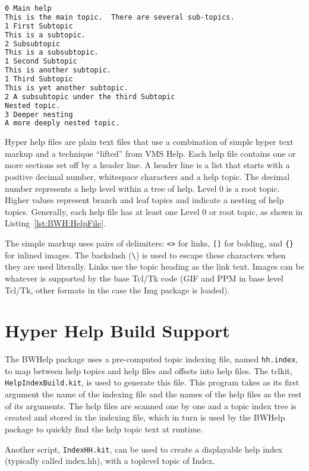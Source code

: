 \begin{lstlisting}[language=HTML,
		   caption={Typical help file},
		   label={lst:BWH:HelpFile}]
0 Main help
This is the main topic.  There are several sub-topics.
1 First Subtopic
This is a subtopic.
2 Subsubtopic
This is a subsubtopic.
1 Second Subtopic
This is another subtopic.
1 Third Subtopic
This is yet another subtopic.
2 A subsubtopic under the third Subtopic
Nested topic.
3 Deeper nesting
A more deeply nested topic.
\end{lstlisting}
Hyper help files are plain text files that use a combination of simple
hyper text markup and a technique ``lifted'' from VMS Help.  Each help
file contains one or more sections set off by a header line.  A header
line is a list that starts with a positive decimal number, whitespace
characters and a help topic.  The decimal number represents a help
level within a tree of help.  Level 0 is a root topic.  Higher values
represent branch and leaf topics and indicate a nesting of help topics.
Generally, each help file has at least one Level 0 or root topic, as
shown in Listing~\ref{lst:BWH:HelpFile}.

The simple markup uses pairs of delimiters: \verb=<>= for links,
\verb=[]= for bolding, and \verb={}= for inlined images.  The backslash
(\verb=\=) is used to escape these characters when they are used
literally.  Links use the topic heading as the link text.  Images can be
whatever is supported by the base Tcl/Tk code (GIF and PPM in base level
Tcl/Tk, other formats in the case the Img package is loaded).


\section{Hyper Help Build Support}
\label{sect:BWH:BuildIndex}

The BWHelp package uses a pre-computed topic indexing file, named
\verb=hh.index=, to map between help topics and help files and offsets
into help files.  The tclkit, \verb=HelpIndexBuild.kit=, is used to
generate this file.  This program takes as its first argument the name
of the indexing file and the names of the help files as the rest of its
arguments.  The help files are scanned one by one and a topic index tree is
created and stored in the indexing file, which in turn is used by the
BWHelp package to quickly find the help topic text at runtime.

Another script, \verb=IndexHH.kit=, can be used to create a displayable
help index (typically called index.hh), with a toplevel topic of Index.
